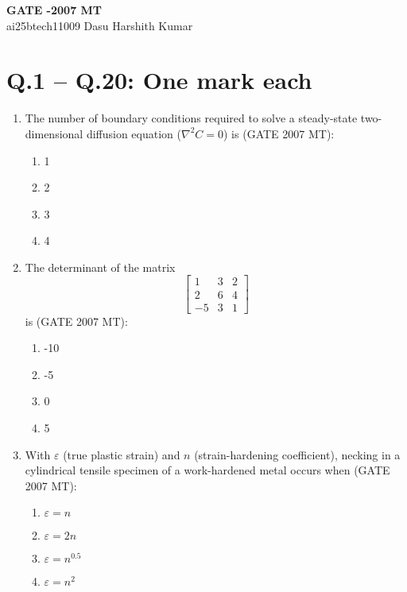 \documentclass[12pt]{article}
\begin{document}
\begin{center}
    {\LARGE \textbf{GATE -2007 MT}} \\
    \vspace{1em}
    ai25btech11009 \qquad Dasu Harshith Kumar
\end{center}

\section*{Q.1 -- Q.20: One mark each}

\begin{enumerate}

\item The number of boundary conditions required to solve a steady-state two-dimensional diffusion equation ($\nabla^2 C = 0$) is (GATE 2007 MT):
    \begin{enumerate}
        \item 1
        \item 2
        \item 3
        \item 4
    \end{enumerate}

\item The determinant of the matrix
$$
\begin{bmatrix}
1 & 3 & 2 \\
2 & 6 & 4 \\
-5 & 3 & 1
\end{bmatrix}
$$
is (GATE 2007 MT):
    \begin{enumerate}
        \item -10
        \item -5
        \item 0
        \item 5
    \end{enumerate}

\item With $\varepsilon$ (true plastic strain) and $n$ (strain-hardening coefficient), necking in a cylindrical tensile specimen of a work-hardened metal occurs when (GATE 2007 MT):
    \begin{enumerate}
        \item $\varepsilon = n$
        \item $\varepsilon = 2n$
        \item $\varepsilon = n^{0.5}$
        \item $\varepsilon = n^2$
    \end{enumerate}


\end{enumerate}
\end{document}
